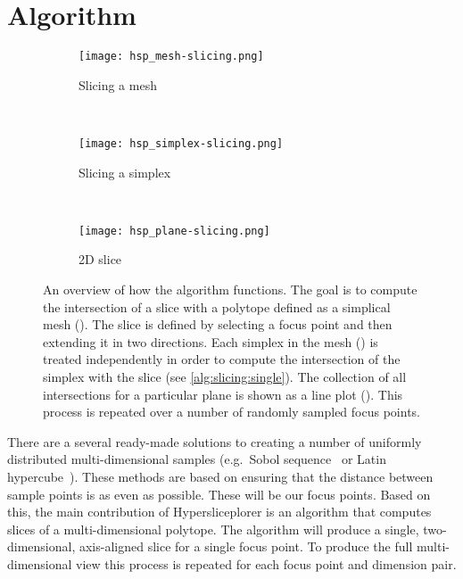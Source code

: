 \section{Algorithm}
\label{sec:algorithm}

\begin{figure*}[ht!]
  \centering
  \begin{subfigure}[b]{0.33\textwidth}
    \texttt{[image: hsp\_mesh-slicing.png]}
    \caption{%
      Slicing a mesh
    }
    \label{fig:slicing:mesh}
  \end{subfigure}
  ~
  \begin{subfigure}[b]{0.33\textwidth}
    \centering
    \texttt{[image: hsp\_simplex-slicing.png]}
    \caption{%
      Slicing a simplex
    }
    \label{fig:slicing:simplex}
  \end{subfigure}
  ~
  \begin{subfigure}[b]{0.24\textwidth}
    \centering
    \texttt{[image: hsp\_plane-slicing.png]}
    \caption{%
      2D slice
    }
    \label{fig:slicing:plane}
  \end{subfigure}
  \caption[An overview of the Hypersliceplorer algorithm]{%
    An overview of how the algorithm functions. The goal is to compute the
    intersection of a slice with a polytope defined as a simplical mesh
    (). The slice is defined by selecting a focus
    point and then extending it in two directions. Each simplex in the mesh
    () is treated
    independently in order to compute the intersection of the simplex with 
    the slice
    (see \autoref{alg:slicing:single}). The collection of all intersections
    for a particular plane is shown as a line plot 
    (). This process is repeated over a number of 
    randomly sampled focus points.
  }
  \label{fig:slicing}
\end{figure*}

There are a several ready-made solutions to creating a number of uniformly
distributed multi-dimensional samples (e.g.\ Sobol sequence~\cite{Sobol:1967}
or Latin hypercube~\cite{Mckay:1979}). These methods are based on ensuring that
the distance between sample points is as even as possible.  These will be our
focus points. Based on this, the main contribution of Hypersliceplorer is an algorithm
that computes slices of a multi-dimensional polytope.  The algorithm will produce a
single, two-dimensional, axis-aligned slice for a single focus point. To produce
the full multi-dimensional view this process is repeated for each focus point
and dimension pair.


